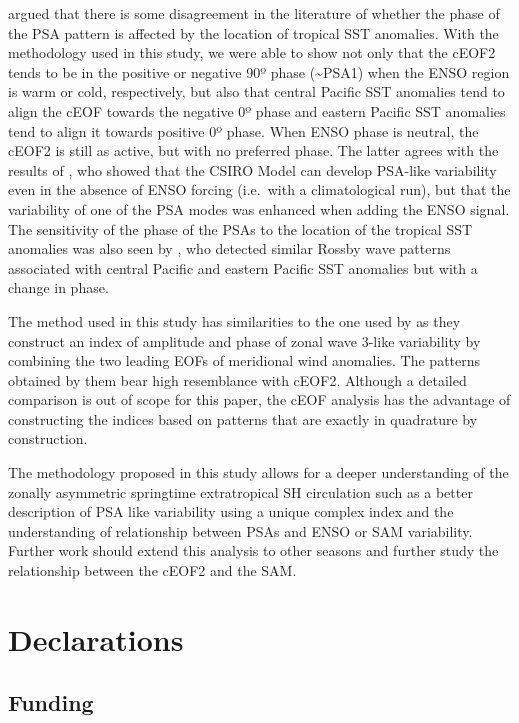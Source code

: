\documentclass[pdflatex,sn-basic]{sn-jnl}
\theoremstyle{thmstyleone}%
\theoremstyle{thmstyletwo}%
\theoremstyle{thmstylethree}%
\begin{document}
\citet{irving2016} argued that there is some disagreement in the literature of whether the phase of the PSA pattern is affected by the location of tropical SST anomalies.
With the methodology used in this study, we were able to show not only that the cEOF2 tends to be in the positive or negative 90º phase (\textasciitilde PSA1) when the ENSO region is warm or cold, respectively, but also that central Pacific SST anomalies tend to align the cEOF towards the negative 0º phase and eastern Pacific SST anomalies tend to align it towards positive 0º phase.
When ENSO phase is neutral, the cEOF2 is still as active, but with no preferred phase.
The latter agrees with the results of \citet{cai2002}, who showed that the CSIRO Model can develop PSA-like variability even in the absence of ENSO forcing (i.e.~with a climatological run), but that the variability of one of the PSA modes was enhanced when adding the ENSO signal.
The sensitivity of the phase of the PSAs to the location of the tropical SST anomalies was also seen by \citet{ciasto2015}, who detected similar Rossby wave patterns associated with central Pacific and eastern Pacific SST anomalies but with a change in phase.

The method used in this study has similarities to the one used by \citet{goyal2022} as they construct an index of amplitude and phase of zonal wave 3-like variability by combining the two leading EOFs of meridional wind anomalies.
The patterns obtained by them bear high resemblance with cEOF2.
Although a detailed comparison is out of scope for this paper, the cEOF analysis has the advantage of constructing the indices based on patterns that are exactly in quadrature by construction.

The methodology proposed in this study allows for a deeper understanding of the zonally asymmetric springtime extratropical SH circulation such as a better description of PSA like variability using a unique complex index and the understanding of relationship between PSAs and ENSO or SAM variability.
Further work should extend this analysis to other seasons and further study the relationship between the cEOF2 and the SAM.

\backmatter

\hypertarget{declarations}{%
\section*{Declarations}\label{declarations}}

\hypertarget{funding}{%
\subsection*{Funding}\label{funding}}
\end{document}
